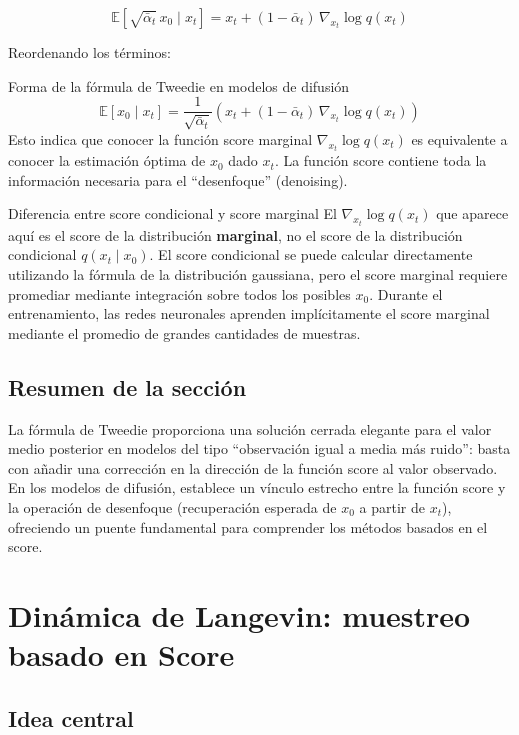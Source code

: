 \documentclass[a4paper]{article}
\begin{document}
$$\mathbb{E}[\sqrt{\bar{\alpha}_t}\, x_0 \mid x_t] = x_t + (1-\bar{\alpha}_t)\, \nabla_{x_t} \log q(x_t)$$

Reordenando los términos:

\begin{importantbox}{Forma de la fórmula de Tweedie en modelos de difusión}
$$\mathbb{E}[x_0 \mid x_t] = \frac{1}{\sqrt{\bar{\alpha}_t}} \left(x_t + (1-\bar{\alpha}_t)\, \nabla_{x_t} \log q(x_t)\right)$$
Esto indica que conocer la función score marginal $\nabla_{x_t} \log q(x_t)$ es equivalente a conocer la estimación óptima de $x_0$ dado $x_t$. La función score contiene toda la información necesaria para el ``desenfoque'' (denoising).
\end{importantbox}

\begin{warningbox}{Diferencia entre score condicional y score marginal}
El $\nabla_{x_t} \log q(x_t)$ que aparece aquí es el score de la distribución \textbf{marginal}, no el score de la distribución condicional $q(x_t \mid x_0)$. El score condicional se puede calcular directamente utilizando la fórmula de la distribución gaussiana, pero el score marginal requiere promediar mediante integración sobre todos los posibles $x_0$. Durante el entrenamiento, las redes neuronales aprenden implícitamente el score marginal mediante el promedio de grandes cantidades de muestras.
\end{warningbox}

\subsection{Resumen de la sección}

La fórmula de Tweedie proporciona una solución cerrada elegante para el valor medio posterior en modelos del tipo ``observación igual a media más ruido'': basta con añadir una corrección en la dirección de la función score al valor observado. En los modelos de difusión, establece un vínculo estrecho entre la función score y la operación de desenfoque (recuperación esperada de $x_0$ a partir de $x_t$), ofreciendo un puente fundamental para comprender los métodos basados en el score.
\section{Dinámica de Langevin: muestreo basado en Score}

\subsection{Idea central}
\end{document}
